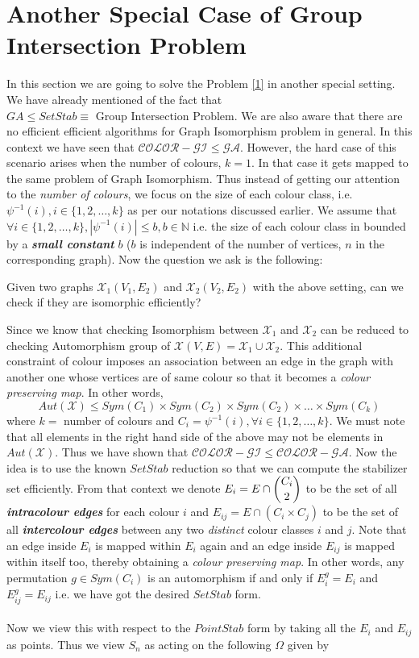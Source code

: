 \section{Another Special Case of Group Intersection Problem}
In this section we are going to solve the Problem \ref{1} in another special setting. We have already mentioned of the fact that $GA\leq SetStab\equiv\text{ Group Intersection Problem}$. We are also aware that there are no efficient efficient algorithms for Graph Isomorphism problem in general. In this context we have seen that $\mathcal{COLOR-GI}\leq \mathcal{GA}$. However, the hard case of this scenario arises when the number of colours, $k=1$. In that case it gets mapped to the same problem of Graph Isomorphism. Thus instead of getting our attention to the \emph{number of colours}, we focus on the size of each colour class, i.e. $\psi^{-1}(i), i\in \{1,2,\ldots,k\}$ as per our notations discussed earlier. We assume that $\forall i\in\{1,2,\ldots,k\}, |\psi^{-1}(i)|\leq b, b\in \mathbb{N}$ i.e. the size of each colour class in bounded by a {\bf \emph{small constant}} $b$ ($b$ is independent of the number of vertices, $n$ in the corresponding graph). Now the question we ask is the following:
\begin{problem}
	Given two graphs $\mathcal{X}_1(V_1,E_2)$ and $\mathcal{X}_2(V_2,E_2)$ with the above setting, can we check if they are isomorphic efficiently?
\end{problem}
Since we know that checking Isomorphism between $\mathcal{X}_1$ and $\mathcal{X}_2$ can be reduced to checking Automorphism group of $\mathcal{X}(V,E)=\mathcal{X}_1\cup \mathcal{X}_2$. This additional constraint of colour imposes  an association between an edge in the graph with another one whose vertices are of same colour so that it becomes a \emph{colour preserving map}. In other words,
\begin{equation*}
	Aut(\mathcal{X})\leq Sym(C_1)\times Sym(C_2)\times Sym(C_2)\times \ldots \times Sym(C_k)
\end{equation*}
where $k =$ number of colours and $C_i = \psi^{-1}(i), \forall i\in \{1,2,\ldots,k\}$. We must note that all elements in the right hand side of the above may not be elements in $Aut(\mathcal{X})$. Thus we have shown that $\mathcal{COLOR-GI}\leq \mathcal{COLOR-GA}$. Now the idea is to use the known $SetStab$ reduction so that we can compute the stabilizer set efficiently. From that context we denote $E_i = E\cap \dbinom{C_i}{2}$ to be the set of all {\bf \emph{intracolour edges}} for each colour $i$ and $E_{ij} = E\cap (C_i\times C_j)$ to be the set of all {\bf \emph{intercolour edges}} between any two \emph{distinct} colour classes $i$ and $j$. Note that an edge inside $E_i$ is mapped within $E_i$ again and an edge inside $E_{ij}$ is mapped within itself too, thereby obtaining a \emph{colour preserving map}. In other words, any permutation $g \in Sym(C_i)$ is an automorphism if and only if $E_i^g = E_i$ and $E_{ij}^g = E_{ij}$ i.e. we have got the desired $SetStab$ form.\\\\Now we view this with respect to the $PointStab$ form by taking all the $E_i$ and $E_{ij}$ as points. Thus we view $S_n$ as acting on the following $\Omega$ given by
